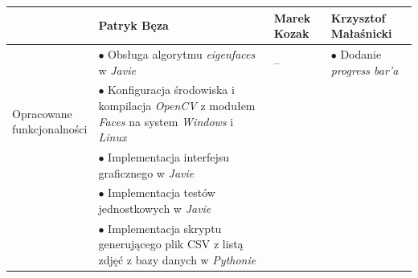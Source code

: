 \documentclass[a4paper,titlepage]{article}
\theoremstyle{break}
\numberwithin{equation}{subsection}
\begin{document}
\begin{appendices}
\begin{table}[H]
\center
\begin{tabular}{p{2.5cm}|p{4cm}|p{4cm}|p{4cm}}
& Patryk Bęza & Marek Kozak & Krzysztof Małaśnicki \\\hline\hline
\multirow{3}{*}{\parbox{3cm}{\ \\Opracowane \\funkcjonalności}} & $\bullet$ Obsługa algorytmu \emph{eigenfaces} w \emph{Javie} & -- & $\bullet$ Dodanie \emph{progress bar'a}\\
& $\bullet$ Konfiguracja środowiska i kompilacja \emph{OpenCV} z modułem \emph{Faces} na system \emph{Windows} i \emph{Linux} & &\\
& $\bullet$ Implementacja interfejsu graficznego w \emph{Javie} & &\\
& $\bullet$ Implementacja testów jednostkowych w \emph{Javie} & &\\
& $\bullet$ Implementacja skryptu generującego plik CSV z listą zdjęć z bazy danych w \emph{Pythonie} & &\\
\end{tabular}
\end{table}

\end{appendices}


\clearpage
\printbibliography[title=Bibliografia]
\end{document}

